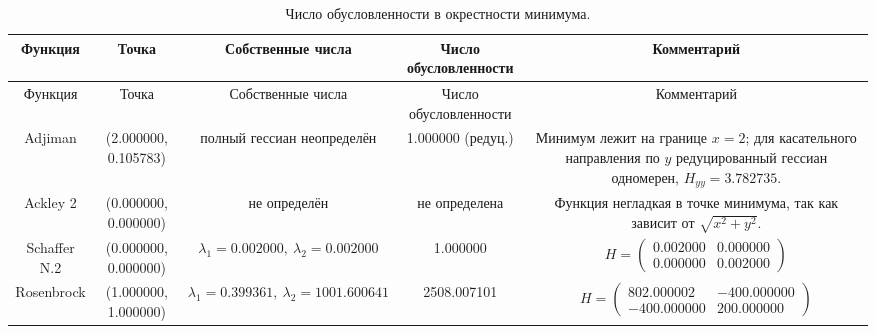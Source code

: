 \begin{longtable}{|c|c|c|c|c|}
\caption{Число обусловленности в окрестности минимума.}\label{tab:conditioning}\\
\hline
Функция & Точка & Собственные числа & Число обусловленности & Комментарий \\
\hline
\endfirsthead
\hline
Функция & Точка & Собственные числа & Число обусловленности & Комментарий \\
\hline
\endhead
Adjiman & (2.000000, 0.105783) & полный гессиан неопределён & 1.000000 (редуц.) & Минимум лежит на границе $x=2$; для касательного направления по $y$ редуцированный гессиан одномерен, $H_{yy}=3.782735$. \\
Ackley 2 & (0.000000, 0.000000) & не определён & не определена & Функция негладкая в точке минимума, так как зависит от $\sqrt{x^2 + y^2}$. \\
Schaffer N.2 & (0.000000, 0.000000) & $\lambda_1=0.002000,\ \lambda_2=0.002000$ & 1.000000 & $H = \begin{pmatrix} 0.002000 & 0.000000 \\ 0.000000 & 0.002000 \end{pmatrix}$ \\
Rosenbrock & (1.000000, 1.000000) & $\lambda_1=0.399361,\ \lambda_2=1001.600641$ & 2508.007101 & $H = \begin{pmatrix} 802.000002 & -400.000000 \\ -400.000000 & 200.000000 \end{pmatrix}$ \\
\hline
\end{longtable}
